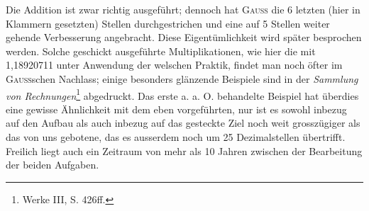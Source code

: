 \endgroup
\par\noindent\hspace*{\parindent}Die Addition ist zwar richtig ausgeführt; dennoch hat \textsc{Gauss} die 6 letzten
(hier in Klammern gesetzten) Stellen durchgestrichen und eine auf 5 Stellen
weiter gehende Verbesserung angebracht. Diese Eigentümlichkeit wird später
besprochen werden. Solche geschickt ausgeführte Multiplikationen, wie hier
die mit 1,18920711 unter Anwendung der welschen Praktik, findet man noch
öfter im \textsc{Gauss}schen Nachlass; einige besonders glänzende Beispiele sind in
der \textit{Sammlung von Rechnungen}\footnote{Werke III, S. 426ff.} abgedruckt. Das erste a. a. O. behandelte
Beispiel hat überdies eine gewisse Ähnlichkeit mit dem eben vorgeführten, nur
ist es sowohl inbezug auf den Aufbau als auch inbezug auf das gesteckte
Ziel noch weit grosszügiger als das von uns gebotene, das es ausserdem noch
um 25 Dezimalstellen übertrifft. Freilich liegt auch ein Zeitraum von mehr
als 10 Jahren zwischen der Bearbeitung der beiden Aufgaben.
\par\clearpage\endgroup
